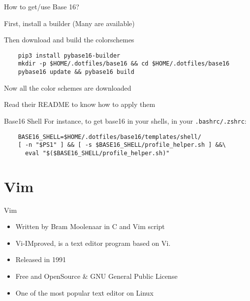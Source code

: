 \documentclass{beamer}
\begin{document}
\begin{frame}[fragile]{How to get/use Base 16?}

  First, install a builder (Many are available)

  Then download and build the colorschemes
  \begin{verbatim}
    pip3 install pybase16-builder
    mkdir -p $HOME/.dotfiles/base16 && cd $HOME/.dotfiles/base16
    pybase16 update && pybase16 build
  \end{verbatim}

  \vspace{1cm}
  Now all the color schemes are downloaded

  Read their README to know how to apply them


\end{frame}
\begin{frame}[fragile]{Base16 Shell}
  For instance, to get base16 in your shells, in your \texttt{.bashrc/.zshrc}:
  \begin{verbatim}
    BASE16_SHELL=$HOME/.dotfiles/base16/templates/shell/
    [ -n "$PS1" ] && [ -s $BASE16_SHELL/profile_helper.sh ] &&\
      eval "$($BASE16_SHELL/profile_helper.sh)"
  \end{verbatim}
\end{frame}


\section{Vim}
\begin{frame}{Vim}

  \begin{itemize}
    \item Written by Bram Moolenaar in C and Vim script
    \item Vi-IMproved, is a text editor program based on Vi.
    \item Released in 1991
    \item Free and OpenSource \& GNU General Public License
    \item One of the most popular text editor on Linux
  \end{itemize}

\end{frame}
\end{document}
